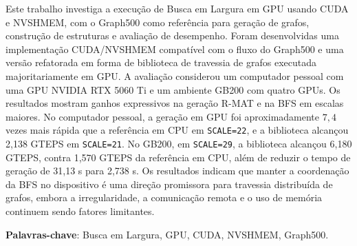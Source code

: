 Este trabalho investiga a execução de Busca em Largura em GPU usando CUDA e
NVSHMEM, com o Graph500 como referência para geração de grafos, construção de
estruturas e avaliação de desempenho. Foram desenvolvidas uma implementação
CUDA/NVSHMEM compatível com o fluxo do Graph500 e uma versão refatorada em forma
de biblioteca de travessia de grafos executada majoritariamente em GPU. A
avaliação considerou um computador pessoal com uma GPU NVIDIA RTX 5060 Ti e um
ambiente GB200 com quatro GPUs. Os resultados mostram ganhos expressivos na
geração R-MAT e na BFS em escalas maiores. No computador pessoal, a geração em
GPU foi aproximadamente $7{,}4$ vezes mais rápida que a referência em CPU em
\texttt{SCALE=22}, e a biblioteca alcançou 2,138 GTEPS em \texttt{SCALE=21}. No
GB200, em \texttt{SCALE=29}, a biblioteca alcançou 6,180 GTEPS, contra 1,570
GTEPS da referência em CPU, além de reduzir o tempo de geração de 31,13 s para
2,738 s. Os resultados indicam que manter a coordenação da BFS no dispositivo é
uma direção promissora para travessia distribuída de grafos, embora a
irregularidade, a comunicação remota e o uso de memória continuem sendo fatores
limitantes.

\textbf{Palavras-chave}: Busca em Largura, GPU, CUDA, NVSHMEM, Graph500.
